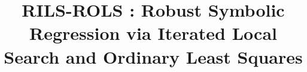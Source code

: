 \documentclass{bmcart}
\begin{document}
\begin{frontmatter}

\begin{fmbox}


\title{ {RILS}-{ROLS} : Robust Symbolic Regression via Iterated Local Search and Ordinary Least Squares}


\author[
  addressref={aff1},                   %
  corref={aff1},                       %
  email={kartelj@matf.bg.ac.rs}   %
]{ }
\author[
  addressref={aff2},
  email={marko.djukanovic@pmf.unibl.org}
]{ }


\address[id=aff1]{%
  ,             %
  ,          %
  ,                              %
}
\address[id=aff2]{%
  ,
  ,
  ,
}


\end{fmbox}
\end{frontmatter}
\end{document}
